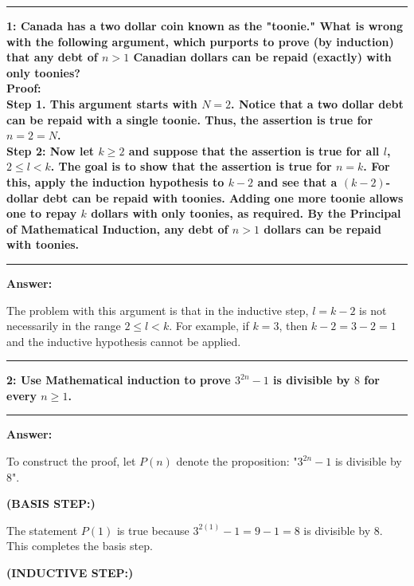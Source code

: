 \documentclass[11pt]{article}
\newcommand\question[2]{\vspace{.25in}\hrule\textbf{#1: #2}\vspace{.5em}\hrule\vspace{.10in}}
\renewcommand\part[1]{\vspace{.10in}\textbf{(#1)}}
\newcommand\answer{\vspace{.10in}\textbf{Answer: }}
\begin{document}
\raggedright
\newcommand\NAME{Stewart Dulaney}  %
\newcommand\SID{1545566}     %
\newcommand\HWNUM{7}              %

\question{1}{Canada has a two dollar coin known as the "toonie." What is wrong with the following argument, which purports to prove (by induction) that any debt of $n > 1$ Canadian dollars can be repaid (exactly) with only toonies?\\[\baselineskip]Proof:\\[\baselineskip]Step 1. This argument starts with $N = 2$. Notice that a two­ dollar debt can be repaid with a single toonie. Thus, the assertion is true for $n = 2 = N$.\\[\baselineskip]Step 2: Now let $k \geq 2$ and suppose that the assertion is true for all $l$, $2 \leq l < k$. The goal is to show that the assertion is true for $n = k$. For this, apply the induction hypothesis to $k - 2$ and see that a ­$(k - 2)$-dollar debt can be repaid with toonies. Adding one more toonie allows one to repay $k$ dollars with only toonies, as required. By the Principal of Mathematical Induction, any debt of $n > 1$ dollars can be repaid with toonies.}

\answer

The problem with this argument is that in the inductive step, $l = k - 2$ is not necessarily in the range $2 \leq l < k$. For example, if $k = 3$, then $k - 2 = 3 - 2 = 1$ and the inductive hypothesis cannot be applied.

\clearpage

\question{2}{Use Mathematical induction to prove $3^{2n} - 1$ is divisible by $8$ for every $n \geq 1$.}

\answer

To construct the proof, let $P(n)$ denote the proposition: "$3^{2n} - 1$ is divisible by $8$".

\part{BASIS STEP:}

The statement $P(1)$ is true because $3^{2(1)} - 1 = 9 - 1 = 8$ is divisible by $8$. This completes the basis step.

\part{INDUCTIVE STEP:}
\end{document}
